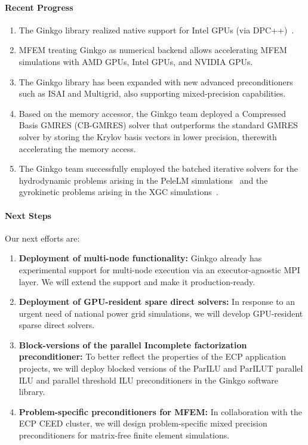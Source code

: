 \paragraph{Recent Progress}
\begin{enumerate}
  \item The Ginkgo library realized native support for Intel GPUs (via
		DPC++)~\cite{portingintel}.
  \item MFEM treating Ginkgo as numerical backend allows accelerating MFEM
		simulations with AMD GPUs, Intel GPUs, and NVIDIA GPUs.
  \item The Ginkgo library has been expanded with new advanced preconditioners
		such as ISAI and Multigrid, also supporting mixed-precision capabilities.
  \item Based on the memory accessor, the Ginkgo team deployed a Compressed
		Basis GMRES (CB-GMRES) solver that outperforms the standard GMRES solver
		by storing the Krylov basis vectors in lower precision, therewith
		accelerating the memory access.
  \item The Ginkgo team successfully employed the batched iterative solvers for
		the hydrodynamic problems arising in the PeleLM
		simulations~\cite{scala21} and the gyrokinetic problems arising in the
		XGC simulations~\cite{ipdps22}.
\end{enumerate}


\paragraph{Next Steps}
Our next efforts are:
\begin{enumerate}
  \item \textbf{Deployment of multi-node functionality:} Ginkgo already has
		experimental support for multi-node execution via an executor-agnostic
		MPI layer. We will extend the support and make it production-ready.
  \item \textbf{Deployment of GPU-resident spare direct solvers:} In response to
		an urgent need of national power grid simulations, we will develop
		GPU-resident sparse direct solvers.
  \item \textbf{Block-versions of the parallel Incomplete factorization
		preconditioner:} To better reflect the properties of the ECP application
		projects, we will deploy blocked versions of the ParILU and ParILUT
		parallel ILU and parallel threshold ILU preconditioners in the Ginkgo
		software library.
  \item \textbf{Problem-specific preconditioners for MFEM:} In collaboration
		with the ECP CEED cluster, we will design problem-specific mixed
		precision preconditioners for matrix-free finite element simulations.
\end{enumerate}
